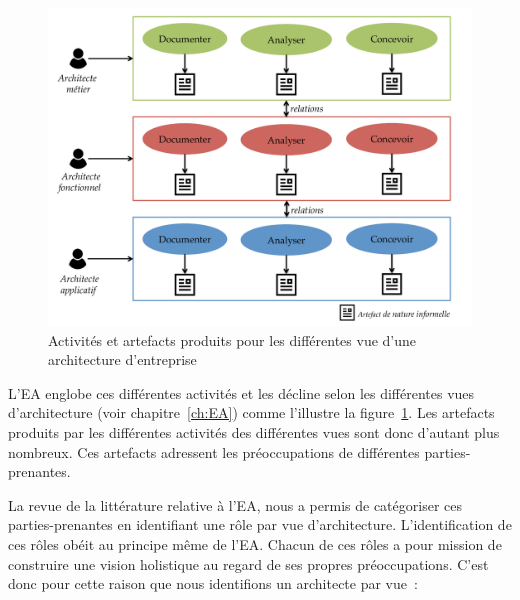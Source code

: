     \begin{figure}[!ht]

         \begin{center}

        \includegraphics[width=1\textwidth]{figures/4_demarche/pratique_courante_ea.pdf}

         \end{center}

         \caption{Activités et artefacts produits pour les différentes vue d'une architecture d'entreprise}

         \label{fig:limites_ea}

    \end{figure}


L'EA englobe ces différentes activités et les décline selon
les différentes vues d'architecture (voir chapitre~\ref{ch:EA}) comme
l'illustre la figure~\ref{fig:limites_ea}. Les artefacts produits par les différentes
activités des différentes vues sont donc d'autant plus nombreux. Ces artefacts
adressent les préoccupations de différentes parties-prenantes.

La revue de la littérature relative à l'EA, nous a permis de catégoriser ces
parties-prenantes en identifiant une rôle par vue d'architecture. L'identification
de ces rôles obéit au principe même de l'EA. Chacun de ces rôles a pour
mission de construire une vision holistique au regard de ses propres
préoccupations. C'est
donc pour cette raison que nous identifions un architecte par vue~:

